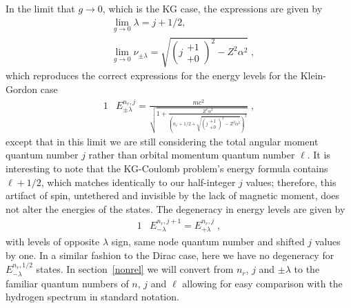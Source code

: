 In the limit that $g\rightarrow 0$, which is the KG case, the expressions are given by
\begin{subequations}
\begin{alignat}{1}
\label{glimit04} &\lim_{g\rightarrow0}\lambda=j+1/2,\\
&\lim_{g\rightarrow0}\nu_{\pm\lambda}=\sqrt{\left(j\begin{smallmatrix} +1 \\ +0 \end{smallmatrix}\right)^{2}-Z^{2}\alpha^{2}}\;,
\end{alignat}
\end{subequations}
which reproduces the correct expressions for the energy levels for the Klein-Gordon case 
\begin{alignat}{1}
\label{glimit05} &E_{\pm\lambda}^{n_{r},j}=\frac{mc^{2}}{\sqrt{1+\displaystyle\frac{Z^{2}\alpha^{2}}{\left(n_{r}+1/2+\displaystyle\sqrt{\left(j\begin{smallmatrix} +1 \\ +0 \end{smallmatrix}\right)^{2}-Z^{2}\alpha^{2}}\right)^{2}}}}\;,\end{alignat}
except that in this limit we are still considering the total angular moment quantum number $j$ rather than orbital momentum quantum number $\ell$. It is interesting to note that the KG-Coulomb problem\rq s energy formula contains $\ell+1/2$, which matches identically to our half-integer $j$ values; therefore, this artifact of spin, untethered and invisible by the lack of magnetic moment, does not alter the energies of the states. The degeneracy in energy levels are given by 
\begin{alignat}{1}
\label{glimit06} &E^{n_{r},j+1}_{-\lambda}=E^{n_{r},j}_{+\lambda}\;,\end{alignat}
with levels of opposite $\lambda$ sign, same node quantum number and shifted $j$ values by one. In a similar fashion to the Dirac case, here we have no degeneracy for $E^{n_{r},1/2}_{-\lambda}$ states. In section~\ref{nonrel} we will convert from $n_{r}$, $j$ and $\pm\lambda$ to the familiar quantum numbers of $n$, $j$ and $\ell$ allowing for easy comparison with the hydrogen spectrum in standard notation.

